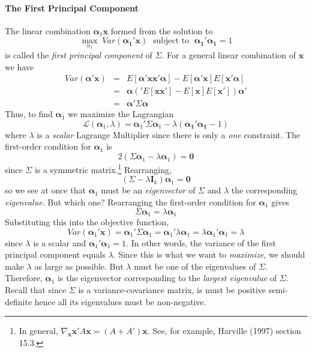 \documentclass[12pt]{article}
\theoremstyle{definition}
\begin{document}
\paragraph{The First Principal Component} The linear combination $\boldsymbol{\alpha}_1 \mathbf{x}$ formed from the solution to
	$$\max_{\alpha_1} \; Var(\boldsymbol{\alpha_1}'\mathbf{x})\;  \mbox{ subject to } \; \boldsymbol{\alpha_1}' \boldsymbol{\alpha_1} = 1$$
is called the \emph{first principal component} of $\Sigma$. For a general linear combination of $\mathbf{x}$ we have
	\begin{eqnarray*}
		Var(\boldsymbol{\alpha}'\mathbf{x}) &=& E[\boldsymbol{\alpha}'\mathbf{x}\mathbf{x}'\boldsymbol{\alpha}] - E[\boldsymbol{\alpha}'\mathbf{x}]E[\mathbf{x}'\boldsymbol{\alpha}]\\
			&=& \boldsymbol{\alpha}\left('E[\mathbf{x}\mathbf{x}'] - E[\mathbf{x}]E[\mathbf{x}'] \right)\boldsymbol{\alpha}'\\
			&=& \boldsymbol{\alpha}' \Sigma \boldsymbol{\alpha}
	\end{eqnarray*}
Thus, to find $\boldsymbol{\alpha}_1$ we maximize the Lagrangian
	$$\mathcal{L}(\boldsymbol{\alpha}_1 ,\lambda) = \boldsymbol{\alpha}_1'\Sigma \boldsymbol{\alpha}_1 - \lambda(\boldsymbol{\alpha_1}' \boldsymbol{\alpha_1}  - 1)$$
where $\lambda$ is a \emph{scalar} Lagrange Multiplier since there is only a \emph{one} constraint. The first-order condition for $\mathbf{\alpha}_1$ is
$$2(\Sigma \boldsymbol{\alpha}_1 - \lambda \boldsymbol{\alpha}_1) = \textbf{0}$$
since $\Sigma$ is a symmetric matrix.\footnote{In general, $\nabla_{\mathbf{x}} \mathbf{x}' A \mathbf{x} = (A + A')\mathbf{x}$. See, for example, Harville (1997) section 15.3.} Rearranging,
	$$(\Sigma - \lambda \textbf{I}_k)\boldsymbol{\alpha}_1 = \textbf{0}$$
so we see at once that $\boldsymbol{\alpha}_1$ must be an \emph{eigenvector} of $\Sigma$ and $\lambda$ the corresponding \emph{eigenvalue}. But which one? Rearranging the first-order condition for $\boldsymbol{\alpha}_1$ gives
	$$\Sigma \boldsymbol{\alpha}_1 = \lambda \boldsymbol{\alpha}_1$$
Substituting this into the objective function, 
	$$Var(\boldsymbol{\alpha}_1' \textbf{x}) =  \boldsymbol{\alpha}_1' \Sigma \boldsymbol{\alpha}_1 = \boldsymbol{\alpha}_1' \lambda \boldsymbol{\alpha}_1 = \lambda \boldsymbol{\alpha}_1' \boldsymbol{\alpha}_1 = \lambda$$
since $\lambda$ is a scalar and $\boldsymbol{\alpha}_1' \boldsymbol{\alpha}_1 = 1$. In other words, the variance of the first principal component equals $\lambda$. Since this is what we want to \emph{maximize}, we should make $\lambda$ as large as possible. But $\lambda$ must be one of the eigenvalues of $\Sigma$. Therefore, $\boldsymbol{\alpha}_1$ is the eigenvector corresponding to the \emph{largest eigenvalue} of $\Sigma$. Recall that since $\Sigma$ is a variance-covariance matrix, is must be positive semi-definite hence all its eigenvalues must be non-negative.
\end{document}
